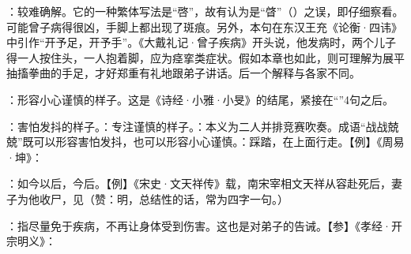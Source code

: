 {
\item {}：较难确解。它的一种繁体写法是“啓”，故有认为是“{䁈}”（）之误，即仔细察看。可能曾子病得很凶，手脚上都出现了斑痕。另外，本句在东汉王充《论衡·四讳》中引作“开予足，开予手”。《大戴礼记·曾子疾病》开头说，他发病时，两个儿子得一人按住头，一人抱着脚，应为痉挛类症状。假如本章也如此，则可理解为展平抽搐拳曲的手足，才好郑重有礼地跟弟子讲话。后一个解释与各家不同。

\item {}：形容小心谨慎的样子。这是《诗经·小雅·小旻》的结尾，紧接在“”4句之后。

：害怕发抖的样子。：专注谨慎的样子。：本义为二人并排竞赛吹奏。成语“战战兢兢”既可以形容害怕发抖，也可以形容小心谨慎。：踩踏，在上面行走。【例】《周易·坤》：
\item {}：如今以后，今后。【例】《宋史·文天祥传》载，南宋宰相文天祥从容赴死后，妻子为他收尸，见（赞：明，总结性的话，常为四字一句。）
\item {}：指尽量免于疾病，不再让身体受到伤害。这也是对弟子的告诫。【参】《孝经·开宗明义》：
}
{}



